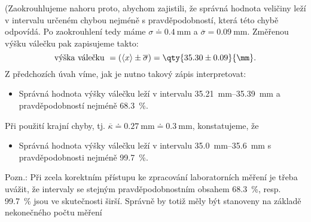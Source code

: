 \begin{mdframed}[style=mdexam]
\begin{example}
    (Zaokrouhlujeme nahoru proto, abychom zajistili, že správná hodnota veličiny leží v intervalu
    určeném chybou nejméně s pravděpodobností, která této chybě odpovídá. Po zaokrouhlení tedy máme
    \(\sigma \doteq \qty{0.4}{\mm}\) a \(\overline{\sigma} = \qty{0.09}{\mm}\). Změřenou výšku válečku
    pak zapisujeme takto:
    \begin{equation*}
      \text{výška válečku } = (\langle x \rangle\pm \overline{\sigma}) = \qty{35.30 \pm 0.09}{\mm}.
    \end{equation*}
    Z předchozích úvah víme, jak je nutno takový zápis interpretovat:
    \begin{itemize}
      \item Správná hodnota výšky válečku leží v intervalu \SIrange[range-units =
            brackets]{35.21}{35.39}{\mm} a pravděpodobností nejméně \qty{68.3}{\percent}.
    \end{itemize}
    Při použití krajní chyby, tj. \(\overline{\kappa} \doteq \qty{0.27}{\mm} \doteq \qty{0.3}{\mm}\),
    konstatujeme, že
    \begin{itemize}
      \item Správná hodnota výšky válečku leží v intervalu \SIrange[range-units =
            brackets]{35.0}{35.6}{\mm} s pravděpodobnosti nejméně \qty{99.7}{\percent}.
    \end{itemize}
    Pozn.: Při zcela korektním přístupu ke zpracování laboratorních měření je třeba uvážit, že
    intervaly se stejným pravděpodobnostním obsahem \qty{68.3}{\percent}, resp. \qty{99.7}{\percent}
    jsou ve skutečnosti širší. Správně by totiž měly být stanoveny na základě nekonečného počtu
    měření
  \end{example}
\end{mdframed}